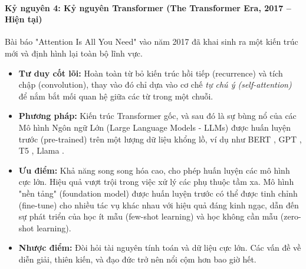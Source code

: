 \paragraph{Kỷ nguyên 4: Kỷ nguyên Transformer (The Transformer Era, 2017 -- Hiện tại)}
Bài báo "Attention Is All You Need" \cite{vaswani2017attention} vào năm 2017 đã khai sinh ra một kiến trúc mới và định hình lại toàn bộ lĩnh vực.
\begin{itemize}
    \item \textbf{Tư duy cốt lõi:} Hoàn toàn từ bỏ kiến trúc hồi tiếp (recurrence) và tích chập (convolution), thay vào đó chỉ dựa vào cơ chế \textit{tự chú ý (self-attention)} để nắm bắt mối quan hệ giữa các từ trong một chuỗi.
    \item \textbf{Phương pháp:} Kiến trúc Transformer gốc, và sau đó là sự bùng nổ của các Mô hình Ngôn ngữ Lớn (Large Language Models - LLMs) được huấn luyện trước (pre-trained) trên một lượng dữ liệu khổng lồ, ví dụ như BERT \cite{devlin2018bert}, GPT \cite{radford2018improving,radford2019language,brown2020language}, T5 \cite{raffel2020exploring}, Llama \cite{touvron2023llama}.
    \item \textbf{Ưu điểm:} Khả năng song song hóa cao, cho phép huấn luyện các mô hình cực lớn. Hiệu quả vượt trội trong việc xử lý các phụ thuộc tầm xa. Mô hình "nền tảng" (foundation model) được huấn luyện trước có thể được tinh chỉnh (fine-tune) cho nhiều tác vụ khác nhau với hiệu quả đáng kinh ngạc, dẫn đến sự phát triển của học ít mẫu (few-shot learning) và học không cần mẫu (zero-shot learning).
    \item \textbf{Nhược điểm:} Đòi hỏi tài nguyên tính toán và dữ liệu cực lớn. Các vấn đề về diễn giải, thiên kiến, và đạo đức trở nên nổi cộm hơn bao giờ hết.
\end{itemize}